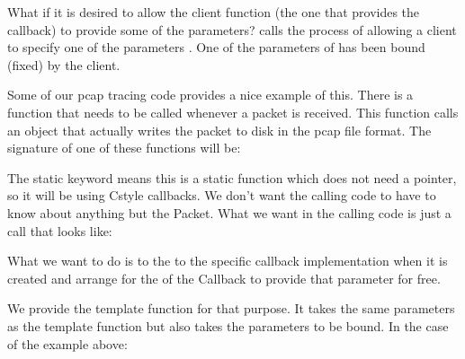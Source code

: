 \documentclass[letterpaper,10pt,english]{sphinxmanual}
\renewcommand{\sphinxcode}[1]{\texttt{\small{#1}}}
\begin{document}
What if it is desired to allow the client function (the one that provides the
callback) to provide some of the parameters?   calls the process of
allowing a client to specify one of the parameters .  One of the
parameters of \sphinxcode{} has been bound (fixed) by the client.

Some of our pcap tracing code provides a nice example of this.  There is a
function that needs to be called whenever a packet is received.  This function
calls an object that actually writes the packet to disk in the pcap file
format.  The signature of one of these functions will be:

\begin{sphinxVerbatim}[commandchars=\\\{\}]
       
\end{sphinxVerbatim}

The static keyword means this is a static function which does not need a
\sphinxcode{} pointer, so it will be using C\sphinxhyphen{}style callbacks.  We don’t want the
calling code to have to know about anything but the Packet.  What we want in
the calling code is just a call that looks like:

\begin{sphinxVerbatim}[commandchars=\\\{\}]
 
\end{sphinxVerbatim}

What we want to do is to  the \sphinxcode{\sphinxupquote{Ptr\textless{}PcapFileWriter\textgreater{} file}} to the
specific callback implementation when it is created and arrange for the
\sphinxcode{} of the Callback to provide that parameter for free.

We provide the \sphinxcode{} template function for that purpose.  It
takes the same parameters as the \sphinxcode{} template function but also
takes the parameters to be bound.  In the case of the example above:

\begin{sphinxVerbatim}[commandchars=\\\{\}]
  
\end{sphinxVerbatim}
\end{document}
